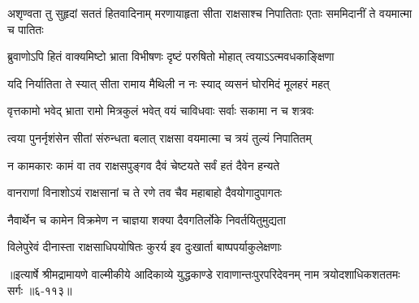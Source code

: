 \threelineshloka
{अशृण्वता तु सुहृदां सततं हितवादिनाम्}
{मरणायाहृता सीता राक्षसाश्च निपातिताः}
{एताः सममिदानीं ते वयमात्मा च पातितः} %

\twolineshloka
{ब्रुवाणोऽपि हितं वाक्यमिष्टो भ्राता विभीषणः}
{दृष्टं परुषितो मोहात् त्वयाऽऽत्मवधकाङ्क्षिणा} %

\twolineshloka
{यदि निर्यातिता ते स्यात् सीता रामाय मैथिली}
{न नः स्याद् व्यसनं घोरमिदं मूलहरं महत्} %

\twolineshloka
{वृत्तकामो भवेद् भ्राता रामो मित्रकुलं भवेत्}
{वयं चाविधवाः सर्वाः सकामा न च शत्रवः} %

\twolineshloka
{त्वया पुनर्नृशंसेन सीतां संरुन्धता बलात्}
{राक्षसा वयमात्मा च त्रयं तुल्यं निपातितम्} %

\twolineshloka
{न कामकारः कामं वा तव राक्षसपुङ्गव}
{दैवं चेष्टयते सर्वं हतं दैवेन हन्यते} %

\twolineshloka
{वानराणां विनाशोऽयं राक्षसानां च ते रणे}
{तव चैव महाबाहो दैवयोगादुपागतः} %

\twolineshloka
{नैवार्थेन च कामेन विक्रमेण न चाज्ञया}
{शक्या दैवगतिर्लोके निवर्तयितुमुद्यता} %

\twolineshloka
{विलेपुरेवं दीनास्ता राक्षसाधिपयोषितः}
{कुरर्य इव दुःखार्ता बाष्पपर्याकुलेक्षणाः} %


॥इत्यार्षे श्रीमद्रामायणे वाल्मीकीये आदिकाव्ये युद्धकाण्डे रावाणान्तःपुरपरिदेवनम् नाम त्रयोदशाधिकशततमः सर्गः ॥६-११३॥
